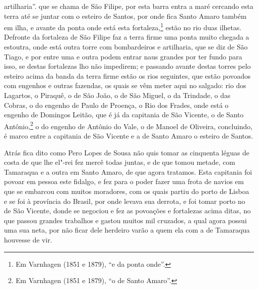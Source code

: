 \begin{linenumbers}
{artilharia''.} que se chama de São Filipe, por esta barra entra a maré cercando esta terra
até se juntar com o esteiro de Santos, por onde fica Santo Amaro também em ilha, e avante
da ponta onde está esta fortaleza,\footnote{ Em Varnhagen (1851 e 1879), ``e da ponta
onde''.} estão no rio duas ilhetas. Defronte da fortaleza de São Filipe faz a terra firme
uma ponta muito chegada a estoutra, onde está outra torre com bombardeiros e artilharia,
que se diz de São Tiago, e por entre uma e outra podem entrar naus grandes por ter fundo
para isso, se destas fortalezas lho não impedirem; e passando avante destas torres pelo
esteiro acima da banda da terra firme estão os rios seguintes, que estão povoados com
engenhos e outras fazendas, os quais se vêm meter aqui no salgado: rio dos Lagartos, o
Piraquê, o de São João, o de São Miguel, o da Trindade, o das Cobras, o do engenho de
Paulo de Proença, o Rio dos Frades, onde está o engenho de Domingos Leitão, que é já da
capitania de São Vicente, o de Santo Antônio,\footnote{ Em Varnhagen (1851 e 1879), ``o de
Santo Amaro''.} o do engenho de Antônio do Vale, o de Manoel de Oliveira, concluindo, é
marco entre a capitania de São Vicente e a de Santo Amaro o esteiro de Santos.

Atrás fica dito como Pero Lopes de Sousa não quis tomar as cinquenta léguas de costa de
que lhe el"-rei fez mercê todas juntas, e de que tomou metade, com Tamaraqua e a outra em
Santo Amaro, de que agora tratamos. Esta capitania foi povoar em pessoa este fidalgo, e
fez para o poder fazer uma frota de navios em que se embarcou com muitos moradores, com os
quais partiu do porto de Lisboa e se foi à província do Brasil, por onde levava sua
derrota, e foi tomar porto no de São Vicente, donde se negociou e fez as povoações e
fortalezas acima ditas, no que passou grandes trabalhos e gastou muitos mil cruzados, a
qual agora possui uma sua neta, por não ficar dele herdeiro varão a quem ela com a de
Tamaraqua houvesse de vir.


\end{linenumbers}
